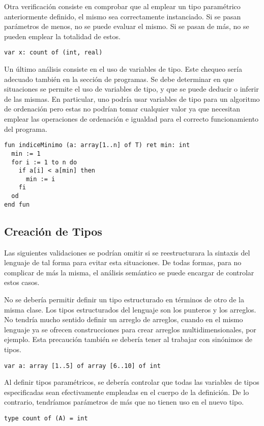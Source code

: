 \documentclass{article}
\begin{document}
Otra verificación consiste en comprobar que al emplear un tipo paramétrico anteriormente definido, el mismo sea correctamente instanciado.
Si se pasan parámetros de menos, no se puede evaluar el mismo.
Si se pasan de más, no se pueden emplear la totalidad de estos.
\begin{lstlisting}
var x: count of (int, real)
\end{lstlisting}

Un último análisis consiste en el uso de variables de tipo.
Este chequeo sería adecuado también en la sección de programas.
Se debe determinar en que situaciones se permite el uso de variables de tipo, y que se puede deducir o inferir de las mismas.
En particular, uno podría usar variables de tipo para un algoritmo de ordenación pero estas no podrían tomar cualquier valor ya que necesitan emplear las operaciones de ordenación e igualdad para el correcto funcionamiento del programa.
\begin{lstlisting}
fun indiceMinimo (a: array[1..n] of T) ret min: int
  min := 1
  for i := 1 to n do
    if a[i] < a[min] then
      min := i
    fi
  od
end fun
\end{lstlisting}

\subsection{Creación de Tipos}

Las siguientes validaciones se podrían omitir si se reestructurara la sintaxis del lenguaje de tal forma para evitar esta situaciones.
De todas formas, para no complicar de más la misma, el análisis semántico se puede encargar de controlar estos casos.

No se debería permitir definir un tipo estructurado en términos de otro de la misma clase.
Los tipos estructurados del lenguaje son los punteros y los arreglos.
No tendría mucho sentido definir un arreglo de arreglos, cuando en el mismo lenguaje ya se ofrecen construcciones para crear arreglos multidimensionales, por ejemplo.
Esta precaución también se debería tener al trabajar con sinónimos de tipos.
\begin{lstlisting}
var a: array [1..5] of array [6..10] of int
\end{lstlisting}

Al definir tipos paramétricos, se debería controlar que todas las variables de tipos especificadas sean efectivamente empleadas en el cuerpo de la definición.
De lo contrario, tendríamos parámetros de más que no tienen uso en el nuevo tipo.
\begin{lstlisting}
type count of (A) = int
\end{lstlisting}
\end{document}
